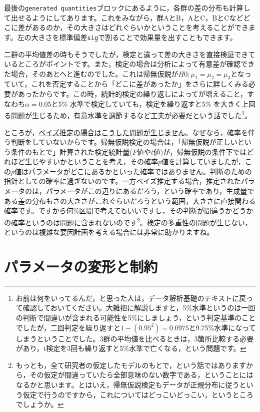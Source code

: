 \documentclass{ltjsbook}
\begin{document}
最後の\verb|generated quantities|ブロックにあるように，各群の差の分布も計算して出せるようにしてあります。これをみながら，群AとB，AとC，BとCなどどこに差があるのか，その大きさはどれぐらいかということを考えることができます。左の大きさを標準偏差\verb|sig|で割ることで効果量を出すこともできます。

二群の平均値差の時もそうでしたが，検定と違って差の大きさを直接検証できているところがポイントです。また，検定の場合は分析によって有意差が確認できた場合，そのあとへと進むのでした。これは帰無仮説が$H0:\mu_1 = \mu_2 = \mu_3$となっていて，これを否定することから「どこに差があったか」をさらに詳しくみる必要があったからです。この時，統計的検定の繰り返しによってが増えること，すなわち$\alpha = 0.05$と5\% 水準で検定していても，検定を繰り返すと5\% を大きく上回る問題が生じるため，有意水準を調節するなど工夫が必要だという話でした\footnote{お前は何をいってるんだ，と思った人は，データ解析基礎のテキストに戻って確認しておいてください。大雑把に解説しますと，5\%水準というのは一回の判断で間違いが含まれる可能性を5\%にしましょう，という判定基準のことでしたが，二回判定を繰り返すと$1-(0.95^2)=0.0975$と9.75\%水準になってしまうということでした。3群の平均値を比べるときは，3箇所比較する必要があり，t検定を3回も繰り返すと5\%水準で亡くなる，という問題です。}。

ところが，\underline{ベイズ推定の場合はこうした問題が生じません}。なぜなら，確率を伴う判断をしていないからです。帰無仮説検定の場合は，「帰無仮説が正しいという条件のもとで」計算された検定統計量($F$値や$t$値)が，帰無仮説の条件下ではどれほど生じやすいかということを考え，その確率$p$値を計算していましたが，この$p$値はパラメータがどこにあるかといった確率ではありません。判断のための指針としての確率に過ぎないのです。一方ベイズ推定する場合，推定されたパラメータのは，パラメータがこの辺りにあるだろう，という確率であり，生成量である差の分布もさの大きさがこれぐらいだろうという範囲，大きさに直接関わる確率です。ですから何\%区間で考えてもいいですし，その判断が間違うかどうかの確率というのは問題に含まれないのです\footnote{もっとも，全て研究者の仮定したモデルのもとで，という話ではありますから，その仮定が間違っていたら全部意味のない数字である，ということにはなるかと思います。とはいえ，帰無仮説検定もデータが正規分布に従うという仮定で行うのですから，これについてはどっこいどっこい，というところでしょうか。}。検定の多重性の問題が生じない，というのは複雑な要因計画を考える場合には非常に助かりますね。

\section{パラメータの変形と制約} 
\end{document}
